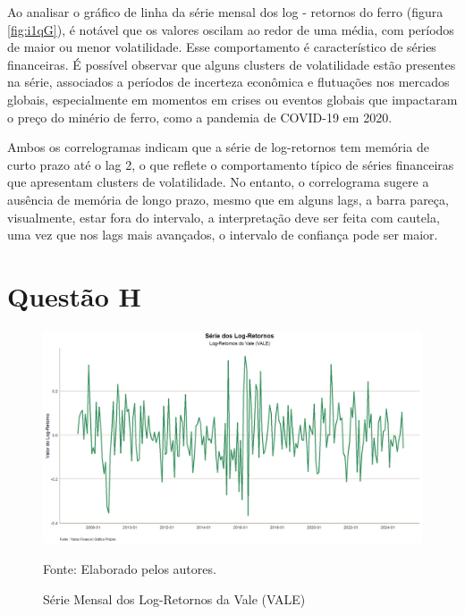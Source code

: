 \documentclass[a4paper,12pt]{article}[abntex2]
\begin{document}
Ao analisar o gráfico de linha da série mensal dos log - retornos do ferro (figura \ref{fig:i1qG}), é notável que os valores oscilam ao redor de uma média, com períodos de maior ou menor volatilidade. Esse comportamento é característico de séries financeiras. É possível observar que alguns clusters de volatilidade estão presentes na série, associados a períodos de incerteza econômica e flutuações nos mercados globais, especialmente em momentos em crises ou eventos globais que impactaram o preço do minério de ferro, como a pandemia de COVID-19 em 2020.

Ambos os correlogramas indicam que a série de log-retornos tem memória de curto prazo até o lag 2, o que reflete o comportamento típico de séries financeiras que apresentam clusters de volatilidade. No entanto, o correlograma sugere a ausência de memória de longo prazo, mesmo que em alguns lags, a barra pareça, visualmente, estar fora do intervalo, a interpretação deve ser feita com cautela, uma vez que nos lags mais avançados, o intervalo de confiança pode ser maior.

\section*{\textbf{Questão H}}

\begin{figure}[H]
    \centering
    \caption{Série Mensal dos Log-Retornos da Vale (VALE)} 
    \includegraphics[width=1.0\textwidth]{APS 2/i1qH.png}
    \label{fig:i1qH}
    
    \footnotesize{Fonte: Elaborado pelos autores.}
    \end{figure}
\end{document}
